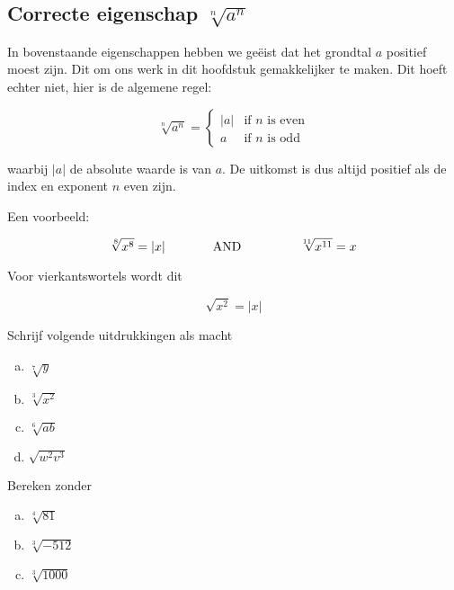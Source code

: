 \documentclass[12pt,twoside]{article}
\begin{document}
\subsection{Correcte eigenschap $\sqrt[n]{a^n}$}

In bovenstaande eigenschappen hebben we geëist dat het grondtal $a$ positief moest zijn. Dit om ons werk in dit hoofdstuk gemakkelijker te maken. Dit hoeft echter niet, hier is de algemene regel:

\[\sqrt[n]{{{a^n}}} = \left\{ {\begin{array}{*{20}{l}}{\left| a \right|}&{{\mbox{if }}n{\mbox{ is
even}}}\\a&{{\mbox{if }}n{\mbox{ is odd}}}\end{array}} \right.\]

waarbij \(\left| a \right|\) de absolute waarde is van $a$. De uitkomst is dus altijd positief als de index en exponent $n$ even zijn.

Een voorbeeld:

\[\sqrt[8]{{{x^8}}} = \left| x
\right|\hspace{0.25in}\hspace{0.25in}{\mbox{AND}}\hspace{0.25in}\hspace{0.25in}\,\,\,\,\,\,\sqrt[{11}]{{{x^
{11}}}} = x\]

Voor vierkantswortels wordt dit

\[\sqrt {{x^2}} = \left| x \right|\]

\begin{oefening}
  Schrijf volgende uitdrukkingen als macht
  \begin{multicols}{2}
    \begin{enumerate}[(a)]
      \itemsep1em
    \item \(\sqrt[7]{y}\)
    \item \(\sqrt[3]{{{x^2}}}\)
    \item \(\sqrt[6]{{ab}}\)
    \item \(\sqrt {{w^2}{v^3}} \)
    \end{enumerate}
  \end{multicols}
\end{oefening}

\begin{oefening}
  Bereken zonder 
  \begin{multicols}{3}
    \begin{enumerate}[(a)]
      \itemsep1em
    \item  \(\sqrt[4]{{81}}\)
    \item \(\sqrt[3]{{ - 512}}\)
    \item \(\sqrt[3]{{1000}}\)
    \end{enumerate}
  \end{multicols}
\end{oefening}
\end{document}

